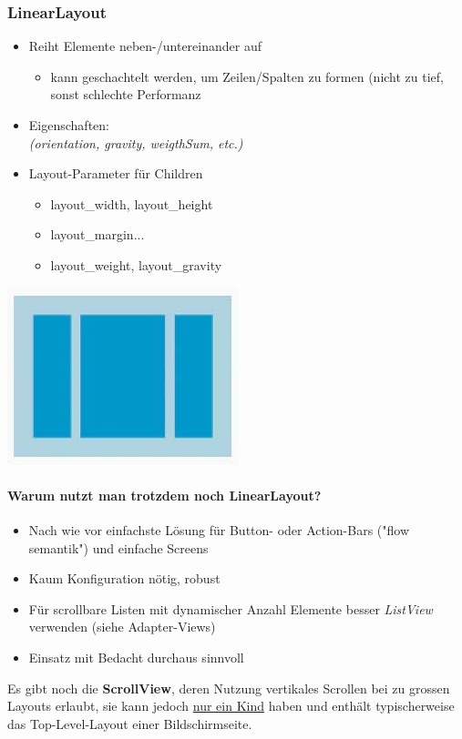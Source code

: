 \documentclass[a4paper]{article}
\begin{document}
\subsubsection{LinearLayout}

\begin{multicols}{2}
\begin{itemize}
	\item Reiht Elemente neben-/untereinander auf
	\begin{itemize}
		\item kann geschachtelt werden, um Zeilen/Spalten zu formen (nicht zu tief, sonst schlechte Performanz
	\end{itemize}
	\item Eigenschaften:\\
	 \textit{(orientation, gravity, weigthSum, etc.)}
	\item Layout-Parameter für Children
	\begin{itemize}
		\item layout\_width, layout\_height
		\item layout\_margin...
		\item layout\_weight, layout\_gravity
	\end{itemize}
\end{itemize}
\columnbreak
\begin{minipage}[c]{\columnwidth}
	\centering
	\includegraphics[width=0.5\linewidth]{img/linearlayout.jpg}
\end{minipage}
\end{multicols}

\paragraph{Warum nutzt man trotzdem noch LinearLayout?}
\begin{itemize}
	\item Nach wie vor einfachste Lösung für Button- oder Action-Bars ("flow semantik") und einfache Screens
	\item Kaum Konfiguration nötig, robust
	\item Für scrollbare Listen mit dynamischer Anzahl Elemente besser \textit{ListView} verwenden (siehe Adapter-Views)
	\item Einsatz mit Bedacht durchaus sinnvoll
\end{itemize}
\vspace{1em}
\noindent
Es gibt noch die \textbf{ScrollView}, deren Nutzung vertikales Scrollen bei zu grossen Layouts erlaubt, sie kann jedoch \underline{nur ein Kind} haben und enthält typischerweise das Top-Level-Layout einer Bildschirmseite.
\end{document}
